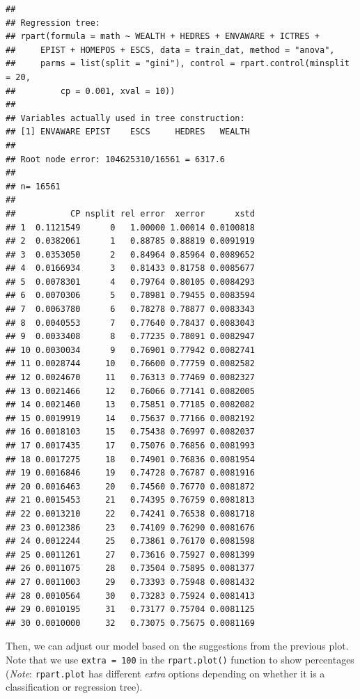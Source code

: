 \documentclass[]{book}
\begin{document}
\begin{verbatim}
## 
## Regression tree:
## rpart(formula = math ~ WEALTH + HEDRES + ENVAWARE + ICTRES + 
##     EPIST + HOMEPOS + ESCS, data = train_dat, method = "anova", 
##     parms = list(split = "gini"), control = rpart.control(minsplit = 20, 
##         cp = 0.001, xval = 10))
## 
## Variables actually used in tree construction:
## [1] ENVAWARE EPIST    ESCS     HEDRES   WEALTH  
## 
## Root node error: 104625310/16561 = 6317.6
## 
## n= 16561 
## 
##           CP nsplit rel error  xerror      xstd
## 1  0.1121549      0   1.00000 1.00014 0.0100818
## 2  0.0382061      1   0.88785 0.88819 0.0091919
## 3  0.0353050      2   0.84964 0.85964 0.0089652
## 4  0.0166934      3   0.81433 0.81758 0.0085677
## 5  0.0078301      4   0.79764 0.80105 0.0084293
## 6  0.0070306      5   0.78981 0.79455 0.0083594
## 7  0.0063780      6   0.78278 0.78877 0.0083343
## 8  0.0040553      7   0.77640 0.78437 0.0083043
## 9  0.0033408      8   0.77235 0.78091 0.0082947
## 10 0.0030034      9   0.76901 0.77942 0.0082741
## 11 0.0028744     10   0.76600 0.77759 0.0082582
## 12 0.0024670     11   0.76313 0.77469 0.0082327
## 13 0.0021466     12   0.76066 0.77141 0.0082005
## 14 0.0021460     13   0.75851 0.77185 0.0082082
## 15 0.0019919     14   0.75637 0.77166 0.0082192
## 16 0.0018103     15   0.75438 0.76997 0.0082037
## 17 0.0017435     17   0.75076 0.76856 0.0081993
## 18 0.0017275     18   0.74901 0.76836 0.0081954
## 19 0.0016846     19   0.74728 0.76787 0.0081916
## 20 0.0016463     20   0.74560 0.76770 0.0081872
## 21 0.0015453     21   0.74395 0.76759 0.0081813
## 22 0.0013210     22   0.74241 0.76538 0.0081718
## 23 0.0012386     23   0.74109 0.76290 0.0081676
## 24 0.0012244     25   0.73861 0.76170 0.0081598
## 25 0.0011261     27   0.73616 0.75927 0.0081399
## 26 0.0011075     28   0.73504 0.75895 0.0081377
## 27 0.0011003     29   0.73393 0.75948 0.0081432
## 28 0.0010564     30   0.73283 0.75924 0.0081413
## 29 0.0010195     31   0.73177 0.75704 0.0081125
## 30 0.0010000     32   0.73075 0.75675 0.0081169
\end{verbatim}

Then, we can adjust our model based on the suggestions from the previous plot. Note that we use \texttt{extra\ =\ 100} in the \texttt{rpart.plot()} function to show percentages (\emph{Note}: \texttt{rpart.plot} has different \emph{extra} options depending on whether it is a classification or regression tree).
\end{document}
